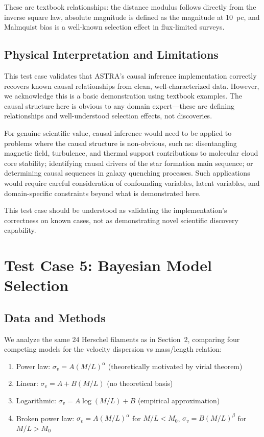 \documentclass[usenatbib]{rasti}
\begin{document}
These are textbook relationships: the distance modulus follows directly from the inverse square law, absolute magnitude is defined as the magnitude at 10~pc, and Malmquist bias is a well-known selection effect in flux-limited surveys.

\subsection{Physical Interpretation and Limitations}

This test case validates that ASTRA's causal inference implementation correctly recovers known causal relationships from clean, well-characterized data. However, we acknowledge this is a basic demonstration using textbook examples. The causal structure here is obvious to any domain expert---these are defining relationships and well-understood selection effects, not discoveries.

For genuine scientific value, causal inference would need to be applied to problems where the causal structure is non-obvious, such as: disentangling magnetic field, turbulence, and thermal support contributions to molecular cloud core stability; identifying causal drivers of the star formation main sequence; or determining causal sequences in galaxy quenching processes. Such applications would require careful consideration of confounding variables, latent variables, and domain-specific constraints beyond what is demonstrated here.

This test case should be understood as validating the implementation's correctness on known cases, not as demonstrating novel scientific discovery capability.

\section{Test Case 5: Bayesian Model Selection}

\subsection{Data and Methods}

We analyze the same 24 Herschel filaments as in Section~2, comparing four competing models for the velocity dispersion vs mass/length relation:
\begin{enumerate}
\item Power law: $\sigma_v = A (M/L)^\alpha$ (theoretically motivated by virial theorem)
\item Linear: $\sigma_v = A + B (M/L)$ (no theoretical basis)
\item Logarithmic: $\sigma_v = A \log(M/L) + B$ (empirical approximation)
\item Broken power law: $\sigma_v = A (M/L)^\alpha$ for $M/L < M_0$, $\sigma_v = B (M/L)^\beta$ for $M/L > M_0$
\end{enumerate}
\end{document}
